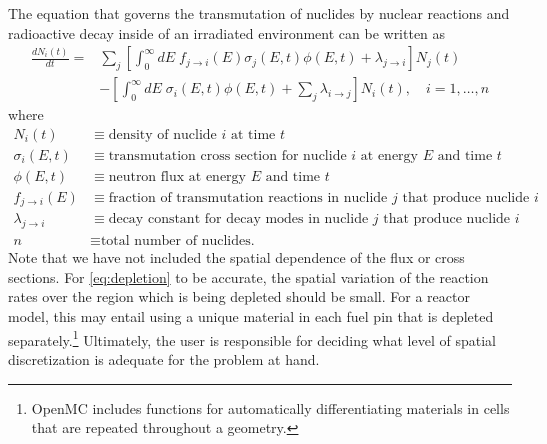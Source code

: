 \documentclass[3p,authoryear]{elsarticle}
\begin{document}
The equation that governs the transmutation of nuclides by nuclear reactions and
radioactive decay inside of an irradiated environment can be written as
\begin{equation}
  \label{eq:depletion}
  \begin{split}
  \frac{dN_i(t)}{dt} = &\sum\limits_j \left [ \int_0^\infty dE \;
  f_{j \rightarrow i}(E) \sigma_j (E, t) \phi(E,t) + \lambda_{j\rightarrow i}
  \right ] N_j(t) \\ &- \left [\int_0^\infty dE \; \sigma_i (E,t) \phi(E,t) +
  \sum\limits_j \lambda_{i\rightarrow j} \right ] N_i(t), \quad i=1,\dots,n
  \end{split}
\end{equation}
where
\begin{equation*}
  \begin{split}
  N_i(t) &\equiv \text{density of nuclide $i$ at time $t$} \\
  \sigma_i(E,t) &\equiv \text{transmutation cross section for nuclide $i$ at energy $E$ and time $t$} \\
  \phi(E,t) &\equiv \text{neutron flux at energy $E$ and time $t$} \\
  f_{j \rightarrow i}(E) &\equiv \text{fraction of transmutation reactions in nuclide $j$ that produce nuclide $i$} \\
  \lambda_{j \rightarrow i} &\equiv \text{decay constant for decay modes in nuclide $j$ that produce nuclide $i$} \\
  n &\equiv \text{total number of nuclides.}
  \end{split}
\end{equation*}
Note that we have not included the spatial dependence of the flux or cross
sections. For \cref{eq:depletion} to be accurate, the spatial variation of the
reaction rates over the region which is being depleted should be small. For a
reactor model, this may entail using a unique material in each fuel pin that is
depleted separately.\footnote{OpenMC includes functions for automatically
differentiating materials in cells that are repeated throughout a geometry.}
Ultimately, the user is responsible for deciding what level of spatial
discretization is adequate for the problem at hand.
\end{document}
